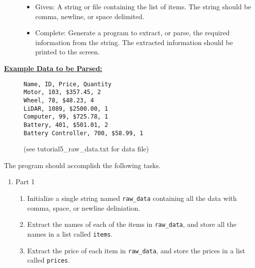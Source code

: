 \documentclass[12pt]{article}
\begin{document}
\begin{description}[labelindent=1cm]
\begin{description}
	\begin{itemize}

		\item Given: A string or file containing the list of items. The string should be comma, newline, or space delimited.
		
		\item Complete: Generate a program to extract, or parse, the required information from the string. The extracted information should be printed to the screen.  

	\end{itemize}      

	\item[\textbf{\underline{Example Data to be Parsed:}}] \hfill \vspace{0mm}

	\begin{verbatim}
Name, ID, Price, Quantity
Motor, 103, $357.45, 2
Wheel, 78, $48.23, 4
LiDAR, 1089, $2500.00, 1
Computer, 99, $725.78, 1
Battery, 401, $501.01, 2
Battery Controller, 700, $58.99, 1
	\end{verbatim}
	\vspace*{10mm}
	(see tutorial5\_raw\_data.txt for data file)



	\end{description}


\newpage
\item[\textbf{\underline{Program Minimum Requirements:}}] \hfill \vspace{0mm}

The program should accomplish the following tasks. 

\begin{enumerate}
	
	\item Part 1 
		\begin{enumerate}

	      \item Initialize a single string named \lstinline{raw_data} containing all the data with comma, space, or newline deliniation. \\
	    
	      \item Extract the names of each of the items in \lstinline{raw_data}, and store all the names in a list called \lstinline{items}. \\

	      \item Extract the price of each item in \lstinline{raw_data}, and store the prices in a list called \lstinline{prices}. \\
	      

\end{enumerate}
\end{enumerate}
\end{description}
\end{document}
